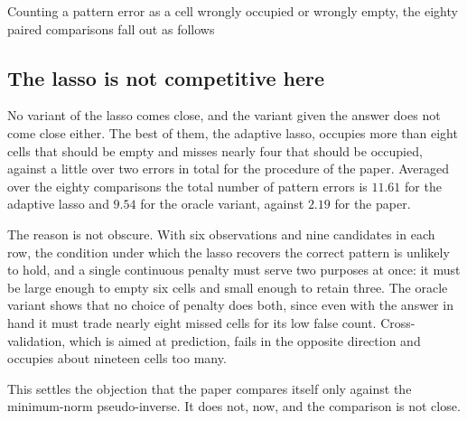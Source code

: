 Counting a pattern error as a cell wrongly occupied or wrongly empty, the eighty
paired comparisons fall out as follows

\begin{center}
\footnotesize
{}
\end{center}

\subsection{The lasso is not competitive here}

No variant of the lasso comes close, and the variant given the answer does not come
close either. The best of them, the adaptive lasso, occupies more than eight cells
that should be empty and misses nearly four that should be occupied, against a
little over two errors in total for the procedure of the paper. Averaged over the
eighty comparisons the total number of pattern errors is $11.61$ for the adaptive
lasso and $9.54$ for the oracle variant, against $2.19$ for the paper.

The reason is not obscure. With six observations and nine candidates in each row,
the condition under which the lasso recovers the correct pattern
\cite{zhao2006} is unlikely to hold, and a single continuous penalty must serve two
purposes at once: it must be large enough to empty six cells and small enough to
retain three. The oracle variant shows that no choice of penalty does both, since
even with the answer in hand it must trade nearly eight missed cells for its low
false count. Cross-validation, which is aimed at prediction, fails in the opposite
direction and occupies about nineteen cells too many.

This settles the objection that the paper compares itself only against the
minimum-norm pseudo-inverse. It does not, now, and the comparison is not close.

